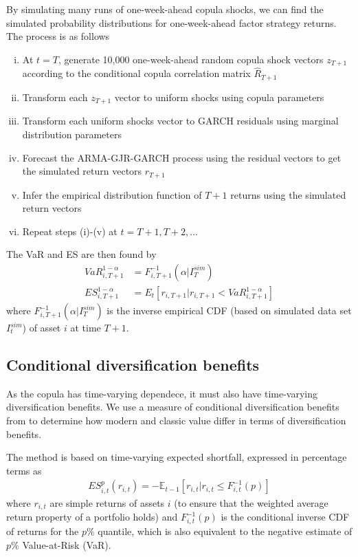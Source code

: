 By simulating many runs of one-week-ahead copula shocks, we can find the simulated probability distributions for one-week-ahead factor strategy returns. The process is as follows
\begin{enumerate}[(i)]
    \item At $t = T$, generate 10,000 one-week-ahead random copula shock vectors $z_{T+1}$ according to the conditional copula correlation matrix $\hat{R}_{T+1}$
    \item Transform each $z_{T+1}$ vector to uniform shocks using copula parameters
    \item Transform each uniform shocks vector to GARCH residuals using marginal distribution parameters
    \item Forecast the ARMA-GJR-GARCH process using the residual vectors to get the simulated return vectors $r_{T+1}$
    \item Infer the empirical distribution function of $T+1$ returns using the simulated return vectors
    \item Repeat steps (i)-(v) at $t = T+1, T+2, ...$
\end{enumerate}
The VaR and ES are then found by
\begin{align}
    VaR_{i,T+1}^{1-\alpha} &= F_{i, T+1}^{-1}(\alpha | I^{sim}_T) \\
    ES_{i, T+1}^{1 - \alpha} &= E_t[r_{i,T+1} | r_{i,T+1} < VaR_{i,T+1}^{1-\alpha}]
\end{align}
where $F_{i, T+1}^{-1}(\alpha | I^{sim}_T)$ is the inverse empirical CDF (based on simulated data set $I^{sim}_t$) of asset $i$ at time $T+1$.

\subsection{Conditional diversification benefits}
As the copula has time-varying dependece, it must also have time-varying diversification benefits. We use a measure of conditional diversification benefits from \textcite{ChristoffersenErrunzaJacobLanglois2012} to determine how modern and classic value differ in terms of diversification benefits. 

The method is based on time-varying expected shortfall, expressed in percentage terms as
\begin{align}
    ES^p_{i,t}(r_{i,t}) = -\mathbb{E}_{t-1}[r_{i,t} | r_{i,t} \leq F_{i,t}^{-1}(p)]
\end{align}
where $r_{i,t}$ are simple returns of assets $i$ (to ensure that the weighted average return property of a portfolio holds) and $F_{i,t}^{-1}(p)$ is the conditional inverse CDF of returns for the $p\%$ quantile, which is also equivalent to the negative estimate of $p\%$ Value-at-Risk (VaR).

